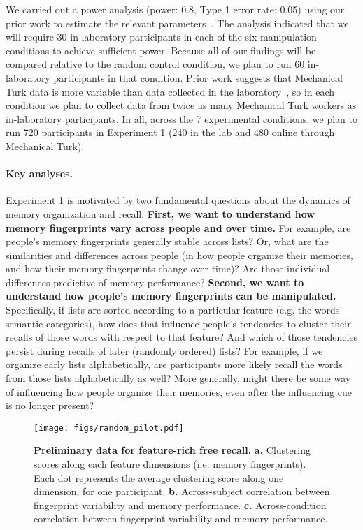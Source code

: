 We carried out a power analysis (power: 0.8, Type 1 error rate: 0.05) using our prior work to estimate the relevant parameters~\citep{MannEtal11, MannEtal12}.  The analysis indicated that we will require 30 in-laboratory participants in each of the six manipulation conditions to achieve sufficient power.  Because all of our findings will be compared relative to the random control condition, we plan to run 60 in-laboratory participants in that condition.  Prior work suggests that Mechanical Turk data is more variable than data collected in the laboratory~\citep{CrumEtal13}, so in each condition we plan to collect data from twice as many Mechanical Turk workers as in-laboratory participants.  In all, across the 7 experimental conditions, we plan to run 720 participants in Experiment 1 (240 in the lab and 480 online through Mechanical Turk).

\paragraph{Key analyses.}
Experiment 1 is motivated by two fundamental questions about the dynamics of memory organization and recall.  \textbf{First, we want to understand how memory fingerprints vary across people and over time.}  For example, are people's memory fingerprints generally stable across lists?  Or, what are the similarities and differences across people (in how people organize their memories, and how their memory fingerprints change over time)?  Are those individual differences predictive of memory performance? \textbf{Second, we want to understand how people's memory fingerprints can be manipulated.}  Specifically, if lists are sorted according to a particular feature (e.g. the words' semantic categories), how does that influence people's tendencies to cluster their recalls of those words with respect to that feature?  And which of those tendencies persist during recalls of later (randomly ordered) lists?  For example, if we organize early lists alphabetically, are  participants more likely recall the words from those lists alphabetically as well?  More generally, might there be some way of influencing how people organize their memories, even after the influencing cue is no longer present?

\begin{wrapfigure}[10]{R}{4.0in}
  \vspace{-52pt}
  \begin{center}
    \texttt{[image: figs/random\_pilot.pdf]}
  \end{center}
\vspace{-18pt}
  \caption{\footnotesize \textbf{Preliminary data for feature-rich free recall.}  \textbf{a.} Clustering scores along each feature dimensions (i.e. memory fingerprints).  Each dot represents the average clustering score along one dimension, for one participant. \textbf{b.} Across-subject correlation between fingerprint variability and memory performance.  \textbf{c.} Across-condition correlation between fingerprint variability and memory performance.}
  \label{fig:random_pilot}
\end{wrapfigure}


